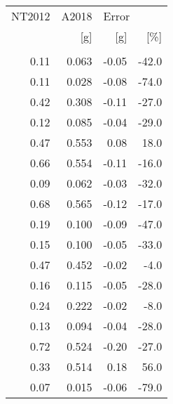 \begin{tabular}{rrrr}
\toprule
NT2012 &  A2018 & \multicolumn{2}{l}{Error} \\
   [g] &    [g] &   [g] &   [\%] \\
       &        &       &       \\
\midrule
  0.11 &  0.063 & -0.05 & -42.0 \\
  0.11 &  0.028 & -0.08 & -74.0 \\
  0.42 &  0.308 & -0.11 & -27.0 \\
  0.12 &  0.085 & -0.04 & -29.0 \\
  0.47 &  0.553 &  0.08 &  18.0 \\
  0.66 &  0.554 & -0.11 & -16.0 \\
  0.09 &  0.062 & -0.03 & -32.0 \\
  0.68 &  0.565 & -0.12 & -17.0 \\
  0.19 &  0.100 & -0.09 & -47.0 \\
  0.15 &  0.100 & -0.05 & -33.0 \\
  0.47 &  0.452 & -0.02 &  -4.0 \\
  0.16 &  0.115 & -0.05 & -28.0 \\
  0.24 &  0.222 & -0.02 &  -8.0 \\
  0.13 &  0.094 & -0.04 & -28.0 \\
  0.72 &  0.524 & -0.20 & -27.0 \\
  0.33 &  0.514 &  0.18 &  56.0 \\
  0.07 &  0.015 & -0.06 & -79.0 \\
\bottomrule
\end{tabular}

